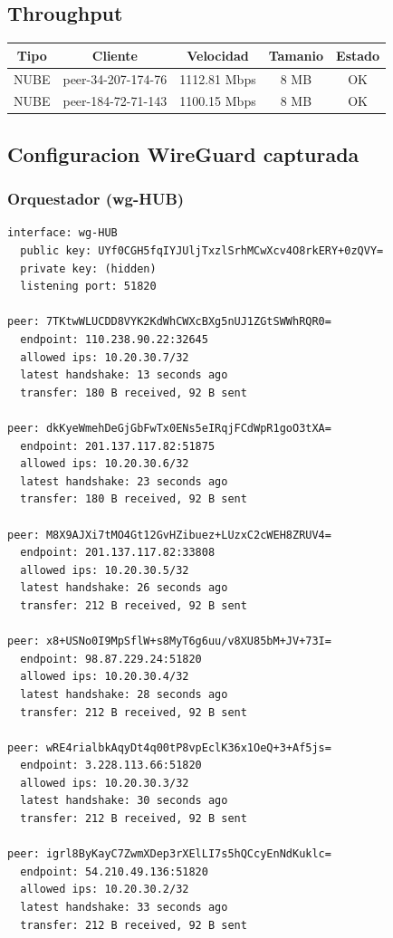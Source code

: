\documentclass[11pt,a4paper]{article}
\begin{document}
\subsection{Throughput}
\begin{longtable}{|c|c|c|c|c|}
\hline
Tipo & Cliente & Velocidad & Tamanio & Estado \\ \hline
NUBE & peer-34-207-174-76 & 1112.81 Mbps & 8 MB & OK \\ \hline
NUBE & peer-184-72-71-143 & 1100.15 Mbps & 8 MB & OK \\ \hline
\end{longtable}

\subsection{Configuracion WireGuard capturada}
\subsubsection*{Orquestador (wg-HUB)}
\begin{lstlisting}
interface: wg-HUB
  public key: UYf0CGH5fqIYJUljTxzlSrhMCwXcv4O8rkERY+0zQVY=
  private key: (hidden)
  listening port: 51820

peer: 7TKtwWLUCDD8VYK2KdWhCWXcBXg5nUJ1ZGtSWWhRQR0=
  endpoint: 110.238.90.22:32645
  allowed ips: 10.20.30.7/32
  latest handshake: 13 seconds ago
  transfer: 180 B received, 92 B sent

peer: dkKyeWmehDeGjGbFwTx0ENs5eIRqjFCdWpR1goO3tXA=
  endpoint: 201.137.117.82:51875
  allowed ips: 10.20.30.6/32
  latest handshake: 23 seconds ago
  transfer: 180 B received, 92 B sent

peer: M8X9AJXi7tMO4Gt12GvHZibuez+LUzxC2cWEH8ZRUV4=
  endpoint: 201.137.117.82:33808
  allowed ips: 10.20.30.5/32
  latest handshake: 26 seconds ago
  transfer: 212 B received, 92 B sent

peer: x8+USNo0I9MpSflW+s8MyT6g6uu/v8XU85bM+JV+73I=
  endpoint: 98.87.229.24:51820
  allowed ips: 10.20.30.4/32
  latest handshake: 28 seconds ago
  transfer: 212 B received, 92 B sent

peer: wRE4rialbkAqyDt4q00tP8vpEclK36x1OeQ+3+Af5js=
  endpoint: 3.228.113.66:51820
  allowed ips: 10.20.30.3/32
  latest handshake: 30 seconds ago
  transfer: 212 B received, 92 B sent

peer: igrl8ByKayC7ZwmXDep3rXElLI7s5hQCcyEnNdKuklc=
  endpoint: 54.210.49.136:51820
  allowed ips: 10.20.30.2/32
  latest handshake: 33 seconds ago
  transfer: 212 B received, 92 B sent

\end{lstlisting}
\end{document}
